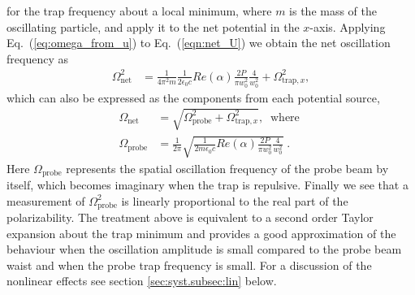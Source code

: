 \documentclass[%
 amsmath,amssymb,
aps,
]{revtex4-2}
\begin{document}
for the trap frequency about a local minimum, where \(m\) is the mass of the oscillating particle, and apply it to the net potential in the \(x\)-axis. Applying Eq.~(\ref{eq:omega_from_u}) to Eq.~(\ref{eqn:net_U}) we obtain the net oscillation frequency as
\begin{align}
\Omega_{\text{net}}^2  & = \frac{1}{4\pi^2m} \frac{1}{2\epsilon_{0} c} Re(\alpha) \frac{2 P}{\pi w_0^2} \frac{4}{w_{0}^{2}} 
+  \Omega_{\text{trap},x}^2,
\end{align}
which can also be expressed as the components from each potential source,
\begin{align}
\Omega_{\text{net}} & =\sqrt{\Omega_{\text{probe}}^{2}+\Omega_{\text{trap},x}^{2}}, \; \; \text{where }\\
\Omega_{\text{probe}}& = \frac{1}{2\pi} \sqrt{\frac{1}{2m \epsilon_{0} c} Re(\alpha) \frac{2 P}{\pi w_0^2} \frac{4}{w_{0}^{2}}} \;.
\end{align}
Here \( \Omega_{\text{probe}} \) represents the spatial oscillation frequency of the probe beam by itself, which becomes imaginary when the trap is repulsive.
Finally we see that a measurement of \( \Omega_{\text{probe}}^2 \) is linearly proportional to the real part of the polarizability. The treatment above is equivalent to a second order Taylor expansion about the trap minimum and provides a good approximation of the behaviour when the oscillation amplitude is small compared to the probe beam waist and when the probe trap frequency is small. For a discussion of the nonlinear effects see section \ref{sec:syst.subsec:lin} below.
\end{document}
